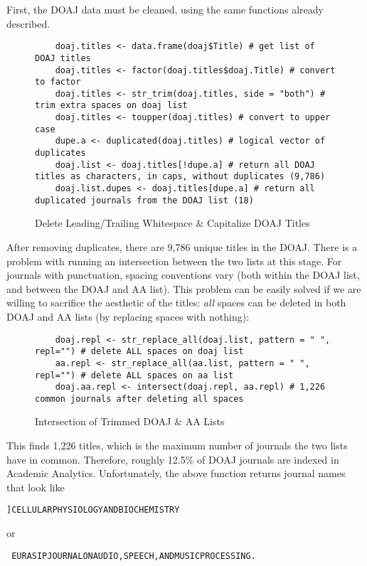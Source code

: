 \documentclass{article}
\begin{document}
First, the DOAJ data must be cleaned, using the same functions already described.
\begin{figure}
	\centering
	\begin{lstlisting}
	doaj.titles <- data.frame(doaj$Title) # get list of DOAJ titles
	doaj.titles <- factor(doaj.titles$doaj.Title) # convert to factor
	doaj.titles <- str_trim(doaj.titles, side = "both") # trim extra spaces on doaj list
	doaj.titles <- toupper(doaj.titles) # convert to upper case
	dupe.a <- duplicated(doaj.titles) # logical vector of duplicates
	doaj.list <- doaj.titles[!dupe.a] # return all DOAJ titles as characters, in caps, without duplicates (9,786)
	doaj.list.dupes <- doaj.titles[dupe.a] # return all duplicated journals from the DOAJ list (18)
	\end{lstlisting}
	\caption{Delete Leading/Trailing Whitespace \& Capitalize DOAJ Titles}
\end{figure}
After removing duplicates, there are 9,786 unique titles in the DOAJ.
There is a problem with running an intersection between the two lists at this stage.
For journals with punctuation, spacing conventions vary (both within the DOAJ list, and between the DOAJ and AA list).
This problem can be easily solved if we are willing to sacrifice the aesthetic of the titles: \textit{all } spaces can be deleted in both DOAJ and AA  lists (by replacing spaces with nothing):
\begin{figure}
	\centering
	\begin{lstlisting}
	doaj.repl <- str_replace_all(doaj.list, pattern = " ", repl="") # delete ALL spaces on doaj list
	aa.repl <- str_replace_all(aa.list, pattern = " ", repl="") # delete ALL spaces on aa list
	doaj.aa.repl <- intersect(doaj.repl, aa.repl) # 1,226 common journals after deleting all spaces
	\end{lstlisting}
	\caption{Intersection of Trimmed DOAJ \& AA Lists}
\end{figure}
This finds 1,226 titles, which is the maximum number of journals the two lists have in common.
Therefore, roughly 12.5\% of DOAJ journals are indexed in Academic Analytics.
Unfortunately, the above function returns journal names that look like \begin{verbatim}]CELLULARPHYSIOLOGYANDBIOCHEMISTRY \end{verbatim} or \begin{verbatim} EURASIPJOURNALONAUDIO,SPEECH,ANDMUSICPROCESSING. \end{verbatim}
\end{document}
